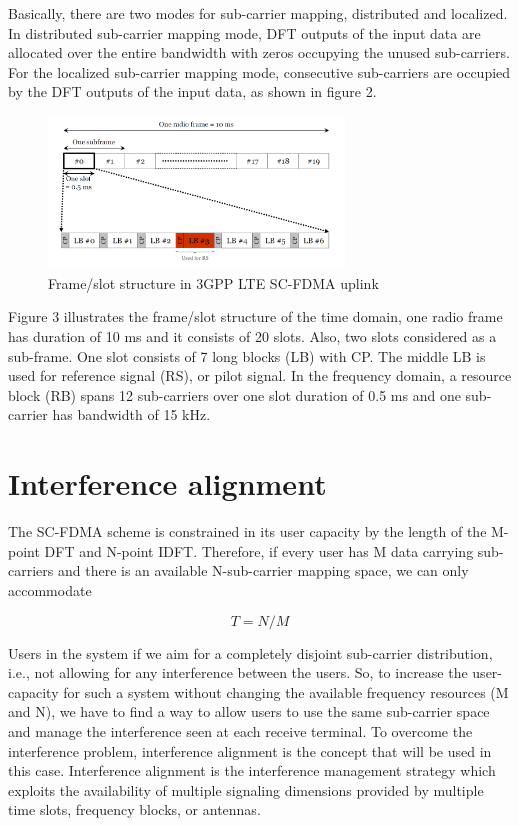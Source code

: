 \documentclass[12pt,a4paper,notitlepage,twoside,headsepline]{scrartcl}
\begin{document}
Basically, there are two modes for sub-carrier mapping, distributed and localized.  In distributed sub-carrier mapping mode, DFT outputs of the input data are allocated over the entire bandwidth with zeros occupying the unused sub-carriers. For the localized sub-carrier mapping mode, consecutive sub-carriers are occupied by the DFT outputs of the input data, as shown in figure 2.


\begin{figure}[!ht]
\begin{center}
\includegraphics[width=0.7\textwidth]{figures/fig3}
\end{center}
\caption{Frame/slot structure in 3GPP LTE SC-FDMA uplink} 
\label{fig:example}
\end{figure}


Figure 3 illustrates the frame/slot structure of the time domain, one radio frame has duration of 10 ms and it consists of 20 slots. Also, two slots considered as a sub-frame. One slot consists of 7 long blocks (LB) with CP. The middle LB is used for reference signal (RS), or pilot signal. In the frequency domain, a resource block (RB) spans 12 sub-carriers over one slot duration of 0.5 ms and one sub-carrier has bandwidth of 15 kHz.


\section{Interference alignment}

The SC-FDMA scheme is constrained in its user capacity by the length of the M-point DFT and N-point IDFT. Therefore, if every user has M data carrying sub-carriers and there is an available N-sub-carrier mapping space, we can only accommodate

\begin{equation}
	T = N/M
\end{equation}


Users in the system if we aim for a completely disjoint sub-carrier distribution, i.e., not allowing for any interference between the users. So, to increase the user-capacity for such a system without changing the available frequency resources (M and N), we have to find a way to allow users to use the same sub-carrier space and manage the interference seen at each receive terminal. To overcome the interference problem, interference alignment is the concept that will be used in this case. Interference alignment is the interference management strategy which exploits the availability of multiple signaling dimensions provided by multiple time slots, frequency blocks, or antennas. 
\end{document}
